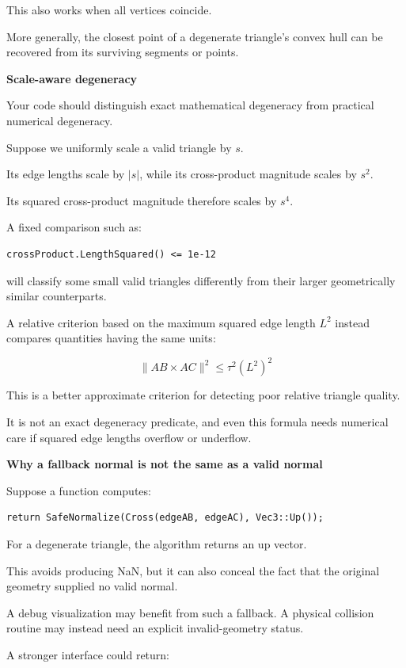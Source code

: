 This also works when all vertices coincide.

More generally, the closest point of a degenerate triangle's convex hull can be recovered from its surviving segments or points.

\textbf{Scale-aware degeneracy}

Your code should distinguish exact mathematical degeneracy from practical numerical degeneracy.

Suppose we uniformly scale a valid triangle by \(s\).

Its edge lengths scale by \(|s|\), while its cross-product magnitude scales by \(s^2\).

Its squared cross-product magnitude therefore scales by \(s^4\).

A fixed comparison such as:

\begin{verbatim}
crossProduct.LengthSquared() <= 1e-12
\end{verbatim}

will classify some small valid triangles differently from their larger geometrically similar counterparts.

A relative criterion based on the maximum squared edge length \(L^2\) instead compares quantities having the same units:

\[
\boxed{ \|AB\times AC\|^2\le\tau^2(L^2)^2 }
\]

This is a better approximate criterion for detecting poor relative triangle quality.

It is not an exact degeneracy predicate, and even this formula needs numerical care if squared edge lengths overflow or underflow.

\textbf{Why a fallback normal is not the same as a valid normal}

Suppose a function computes:

\begin{verbatim}
return SafeNormalize(Cross(edgeAB, edgeAC), Vec3::Up());
\end{verbatim}

For a degenerate triangle, the algorithm returns an up vector.

This avoids producing NaN, but it can also conceal the fact that the original geometry supplied no valid normal.

A debug visualization may benefit from such a fallback. A physical collision routine may instead need an explicit invalid-geometry status.

A stronger interface could return:

